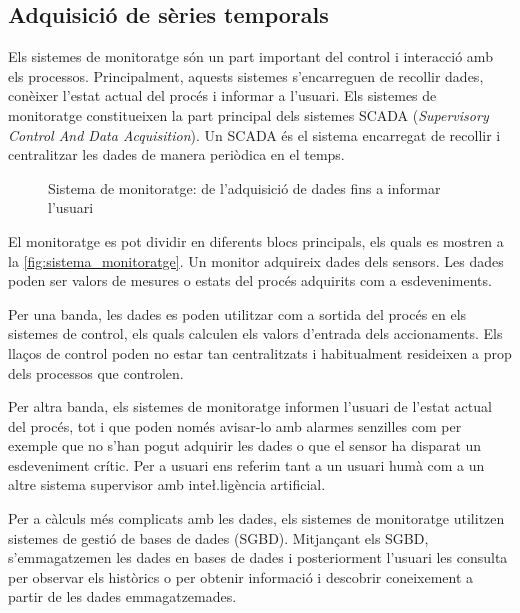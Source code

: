 \subsection{Adquisició de sèries temporals}

Els sistemes de monitoratge són un part important del control i interacció amb els processos. Principalment, aquests sistemes s'encarreguen de recollir dades, conèixer l'estat actual del procés i informar a l'usuari. Els sistemes de monitoratge constitueixen la part principal dels sistemes SCADA (\emph{Supervisory Control And Data Acquisition}). Un SCADA  és el sistema encarregat de recollir i centralitzar les dades de manera periòdica en el temps.



\begin{figure}[tp]
  \begin{center}
    \scriptsize 
    
  \end{center}
  \caption{Sistema de monitoratge: de l'adquisició de dades fins a informar l'usuari}
  \label{fig:sistema_monitoratge}
\end{figure}


El monitoratge es pot dividir en diferents blocs principals, els quals es mostren a la \autoref{fig:sistema_monitoratge}. Un monitor adquireix dades dels sensors. Les dades poden ser valors de mesures o estats del procés adquirits com a esdeveniments. 

Per una banda, les dades es poden utilitzar com a sortida del procés en els sistemes de control, els quals calculen els valors d'entrada dels accionaments.
Els llaços de control poden no estar tan centralitzats i habitualment resideixen a prop dels processos que controlen.

Per altra banda, els sistemes de monitoratge informen l'usuari de l'estat actual del procés, tot i que poden només avisar-lo amb alarmes senzilles com per exemple que no s'han pogut adquirir les dades o que el sensor ha disparat un esdeveniment crític. Per a usuari ens referim tant a un usuari humà com a un altre sistema supervisor amb inte\l.ligència artificial. 

Per a càlculs més complicats amb les dades, els sistemes de monitoratge utilitzen sistemes de gestió de bases de dades (SGBD). Mitjançant els SGBD, s'emmagatzemen les dades en bases de dades i posteriorment l'usuari les consulta per observar els històrics o per obtenir informació i descobrir coneixement a partir de les dades emmagatzemades. 

